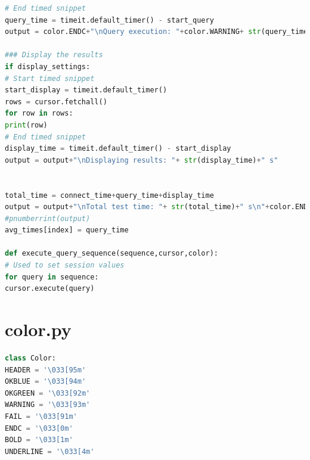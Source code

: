\documentclass[a4paper,english]{report}
\begin{document}
\begin{lstlisting}[language=Python, caption=connection.py\, the file defining how to communicate with the cluster and run queries against it]
# End timed snippet
query_time = timeit.default_timer() - start_query
output = color.ENDC+"\nQuery execution: "+color.WARNING+ str(query_time)+" s"+color.OKGREEN

### Display the results
if display_settings:
# Start timed snippet
start_display = timeit.default_timer()
rows = cursor.fetchall()
for row in rows:
print(row)
# End timed snippet
display_time = timeit.default_timer() - start_display
output = output+"\nDisplaying results: "+ str(display_time)+" s"


total_time = connect_time+query_time+display_time
output = output+"\nTotal test time: "+ str(total_time)+" s\n"+color.ENDC
#pnumberrint(output)
avg_times[index] = query_time

def execute_query_sequence(sequence,cursor,color):
# Used to set session values
for query in sequence:
cursor.execute(query)

\end{lstlisting}

\section{color.py}
\begin{lstlisting}[language=Python, caption=color.py\, just a tiny class that colors the output]
class Color:
HEADER = '\033[95m'
OKBLUE = '\033[94m'
OKGREEN = '\033[92m'
WARNING = '\033[93m'
FAIL = '\033[91m'
ENDC = '\033[0m'
BOLD = '\033[1m'
UNDERLINE = '\033[4m'
\end{lstlisting}
\end{document}
